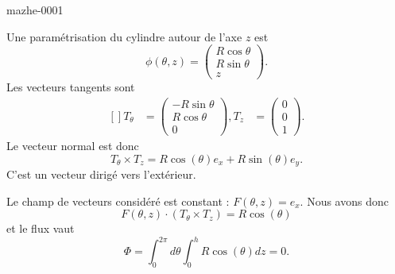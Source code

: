 
\begin{corrige}{mazhe-0001}

    Une paramétrisation du cylindre autour de l'axe $z$ est
    \begin{equation}
        \phi(\theta,z)=\begin{pmatrix}
            R\cos\theta    \\ 
            R\sin\theta    \\ 
            z    
        \end{pmatrix}.
    \end{equation}
    Les vecteurs tangents sont
    \begin{equation}
        \begin{aligned}[]
            T_{\theta}&=\begin{pmatrix}
                -R\sin\theta    \\ 
                R\cos\theta    \\ 
                0    
            \end{pmatrix},
            T_z&=\begin{pmatrix}
                0    \\ 
                0    \\ 
                1    
            \end{pmatrix}.
        \end{aligned}
    \end{equation}
    Le vecteur normal est donc
    \begin{equation}
        T_{\theta}\times T_z=R\cos(\theta)e_x+R\sin(\theta)e_y.
    \end{equation}
    C'est un vecteur dirigé vers l'extérieur.

    Le champ de vecteurs considéré est constant : $F(\theta,z)=e_x$. Nous avons donc
    \begin{equation}
        F(\theta,z)\cdot(T_{\theta}\times T_z)=R\cos(\theta)
    \end{equation}
    et le flux vaut
    \begin{equation}
        \Phi=\int_0^{2\pi}d\theta\int_0^hR\cos(\theta)dz=0.
    \end{equation}
    

\end{corrige}
